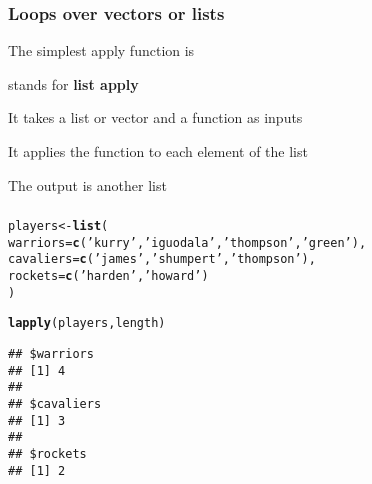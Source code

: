 \documentclass[12pt]{beamer}\usepackage[]{graphicx}\usepackage[]{color}
\makeatletter
\newcommand{\hlstr}[1]{\textcolor[rgb]{0.192,0.494,0.8}{#1}}%
\newcommand{\hlstd}[1]{\textcolor[rgb]{0.345,0.345,0.345}{#1}}%
\newcommand{\hlkwb}[1]{\textcolor[rgb]{0.69,0.353,0.396}{#1}}%
\newcommand{\hlkwc}[1]{\textcolor[rgb]{0.333,0.667,0.333}{#1}}%
\newcommand{\hlkwd}[1]{\textcolor[rgb]{0.737,0.353,0.396}{\textbf{#1}}}%
\newenvironment{kframe}{%
 \def\at@end@of@kframe{}%
 \ifinner\ifhmode%
  \def\at@end@of@kframe{\end{minipage}}%
  \begin{minipage}{\columnwidth}%
 \fi\fi%
 \def\FrameCommand##1{\hskip\@totalleftmargin \hskip-\fboxsep
 \colorbox{shadecolor}{##1}\hskip-\fboxsep
     \hskip-\linewidth \hskip-\@totalleftmargin \hskip\columnwidth}%
 \MakeFramed {\advance\hsize-\width
   \@totalleftmargin\z@ \linewidth\hsize
   \@setminipage}}%
 {\par\unskip\endMakeFramed%
 \at@end@of@kframe}
\newenvironment{knitrout}{}{} %
\makeatother
\begin{document}

\begin{frame}
\frametitle{Loops over vectors or lists}

\bi
  \item The simplest apply function is {\hilit {}}
  \item {} stands for \textbf{list apply}
  \item It takes a list or vector and a function as inputs
  \item It applies the function to each element of the list
  \item The output is another list
\ei

\end{frame}


\begin{frame}[fragile]
\frametitle{}

\begin{knitrout}\footnotesize
{}\color{fgcolor}\begin{kframe}
\begin{alltt}
\hlstd{players} \hlkwb{<-} \hlkwd{list}\hlstd{(}
  \hlkwc{warriors} \hlstd{=} \hlkwd{c}\hlstd{(}\hlstr{'kurry'}\hlstd{,} \hlstr{'iguodala'}\hlstd{,} \hlstr{'thompson'}\hlstd{,} \hlstr{'green'}\hlstd{),}
  \hlkwc{cavaliers} \hlstd{=} \hlkwd{c}\hlstd{(}\hlstr{'james'}\hlstd{,} \hlstr{'shumpert'}\hlstd{,} \hlstr{'thompson'}\hlstd{),}
  \hlkwc{rockets} \hlstd{=} \hlkwd{c}\hlstd{(}\hlstr{'harden'}\hlstd{,} \hlstr{'howard'}\hlstd{)}
\hlstd{)}

\hlkwd{lapply}\hlstd{(players, length)}
\end{alltt}
\begin{verbatim}
## $warriors
## [1] 4
## 
## $cavaliers
## [1] 3
## 
## $rockets
## [1] 2
\end{verbatim}
\end{kframe}
\end{knitrout}

\end{frame}

\end{document}
